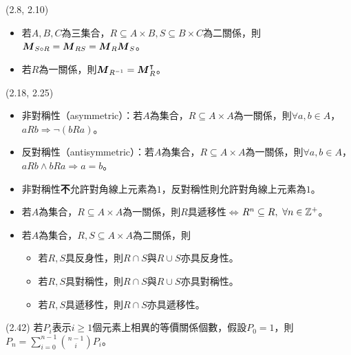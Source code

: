 \item \begin{theorem}{(2.8, 2.10)} \quad\quad
    \begin{itemize}
        \item 若$A, B, C$為三集合，$R \subseteq A \times B, S \subseteq B \times C$為二關係，則$\boldsymbol{M}_{S \circ R} = \boldsymbol{M}_{RS} = \boldsymbol{M}_{R}\boldsymbol{M}_{S}$。
        \item 若$R$為一關係，則$\boldsymbol{M}_{R^{-1}} = \boldsymbol{M}_{R}^\intercal$。
    \end{itemize}
\end{theorem}

\item \begin{theorem}{(2.18, 2.25)} \quad\quad
    \begin{itemize}
        \item 非對稱性（asymmetric）：若$A$為集合，$R \subseteq A \times A$為一關係，則$\forall a, b \in A$，$aRb \Rightarrow \lnot(bRa)$。
        \item 反對稱性（antisymmetric）：若$A$為集合，$R \subseteq A \times A$為一關係，則$\forall a, b \in A$，$aRb \land bRa \Rightarrow a = b$。
        \item 非對稱性\textbf{不}允許對角線上元素為$1$，反對稱性則允許對角線上元素為$1$。
        \item 若$A$為集合，$R \subseteq A \times A$為一關係，則$R$具遞移性$\iff$$R^n \subseteq R, \ \forall n \in \mathbb{Z}^+$。
        \item 若$A$為集合，$R, S \subseteq A \times A$為二關係，則
        \begin{itemize}
            \item 若$R, S$具反身性，則$R \cap S$與$R \cup S$亦具反身性。
            \item 若$R, S$具對稱性，則$R \cap S$與$R \cup S$亦具對稱性。
            \item 若$R, S$具遞移性，則$R \cap S$亦具遞移性。
        \end{itemize}
    \end{itemize}
\end{theorem}

\item \begin{theorem}{(2.42)} 若$P_i$表示$i \ge 1$個元素上相異的等價關係個數，假設$P_0 = 1$，則$P_n = \sum_{i = 0}^{n - 1}\binom{n - 1}{i}P_i$。
\end{theorem}

